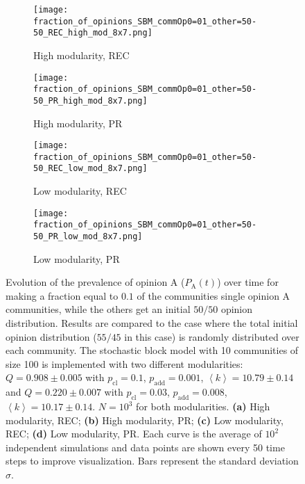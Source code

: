\documentclass[11 pt , letterpaper , twoside , openright]{book}
\begin{document}
\begin{figure}[H]
  \begin{subfigure}[b]{0.49\textwidth}
    \caption{High modularity, REC}
  	\texttt{[image: fraction\_of\_opinions\_SBM\_commOp0=01\_other=50-50\_REC\_high\_mod\_8x7.png]}
    \label{high_mod_rec}
  \end{subfigure}
  \begin{subfigure}[b]{0.49\textwidth}
    \caption{High modularity, PR}
  	\texttt{[image: fraction\_of\_opinions\_SBM\_commOp0=01\_other=50-50\_PR\_high\_mod\_8x7.png]}
    \label{high_mod_pr}
  \end{subfigure}
  \begin{subfigure}[b]{0.49\textwidth}
   \caption{Low modularity, REC}
    \texttt{[image: fraction\_of\_opinions\_SBM\_commOp0=01\_other=50-50\_REC\_low\_mod\_8x7.png]}
    \label{low_mod_rec}
  \end{subfigure}
  \begin{subfigure}[b]{0.49\textwidth}
    \caption{Low modularity, PR}
    \texttt{[image: fraction\_of\_opinions\_SBM\_commOp0=01\_other=50-50\_PR\_low\_mod\_8x7.png]}
    \label{low_mod_pr}
  \end{subfigure}
  \captionsetup{format=plain}
  \caption[Evolution of the prevalence of opinion A ($P_\text{A}(t)$) over time for making a fraction equal to $0.1$ of the communities single opinion A communities, while the others get an initial $50/50$ opinion distribution. Results are compared to the case where the total initial opinion distribution ($55/45$ in this case) is randomly distributed over each community.]{Evolution of the prevalence of opinion A ($P_\text{A}(t)$) over time for making a fraction equal to $0.1$ of the communities single opinion A communities, while the others get an initial $50/50$ opinion distribution. Results are compared to the case where the total initial opinion distribution ($55/45$ in this case) is randomly distributed over each community. The stochastic block model with 10 communities of size 100 is implemented with two different modularities: $Q = 0.908 \pm 0.005$ with $p_{\text{cl}} = 0.1$, $p_{\text{add}} = 0.001$, $\left<k\right> = 10.79 \pm 0.14$ and $Q = 0.220 \pm 0.007$ with $p_{\text{cl}} = 0.03$, $p_{\text{add}} = 0.008$, $\left<k\right> = 10.17 \pm 0.14$. $N = 10^3$ for both modularities. \textbf{(a)} High modularity, REC; \textbf{(b)} High modularity, PR; \textbf{(c)} Low modularity, REC; \textbf{(d)} Low modularity, PR. Each curve is the average of $10^2$ independent simulations and data points are shown every 50 time steps to improve visualization. Bars represent the standard deviation $\sigma$.}
\label{commOp0_01_other_50-50}
\end{figure}
\end{document}
